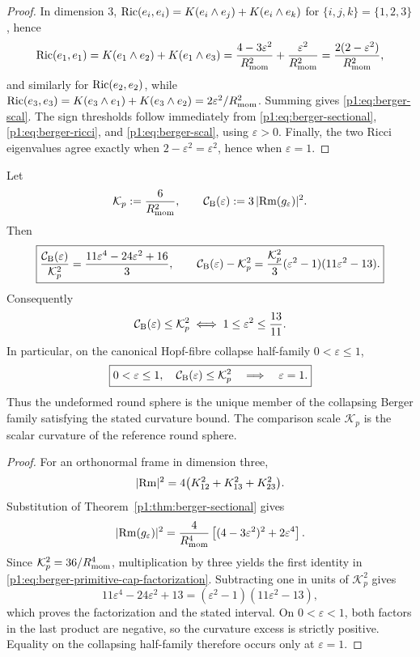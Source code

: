 \documentclass[11pt]{article}
\begin{document}
\begin{proof}
In dimension $3$, $\operatorname{Ric}(e_i,e_i)=K(e_i\wedge e_j)+K(e_i\wedge e_k)$ for $\{i,j,k\}=\{1,2,3\}$, hence
\[
\operatorname{Ric}(e_1,e_1)=K(e_1\wedge e_2)+K(e_1\wedge e_3)=\frac{4-3\varepsilon^2}{R_{\mathrm{mom}}^2}+\frac{\varepsilon^2}{R_{\mathrm{mom}}^2}
=\frac{2(2-\varepsilon^2)}{R_{\mathrm{mom}}^2},
\]
and similarly for $\operatorname{Ric}(e_2,e_2)$, while $\operatorname{Ric}(e_3,e_3)=K(e_3\wedge e_1)+K(e_3\wedge e_2)=2\varepsilon^2/R_{\mathrm{mom}}^2$.
Summing gives \eqref{p1:eq:berger-scal}.
The sign thresholds follow immediately from
\eqref{p1:eq:berger-sectional}, \eqref{p1:eq:berger-ricci}, and
\eqref{p1:eq:berger-scal}, using \(\varepsilon>0\).  Finally, the two Ricci
eigenvalues agree exactly when \(2-\varepsilon^2=\varepsilon^2\), hence when
\(\varepsilon=1\).
\end{proof}

\begin{corollary}
\label{p1:cor:berger-primitive-cap-rigidity}
Let
\[
 \mathcal K_p:=\frac{6}{R_{\mathrm{mom}}^2},
 \qquad
 \mathcal C_{\rm B}(\varepsilon)
 :=3\,\lvert\operatorname{Rm}(g_\varepsilon)\rvert^2 .
\]
Then
\begin{equation}
\label{p1:eq:berger-primitive-cap-factorization}
 \boxed{
 \frac{\mathcal C_{\rm B}(\varepsilon)}{\mathcal K_p^2}
 =\frac{11\varepsilon^4-24\varepsilon^2+16}{3},
 \qquad
 \mathcal C_{\rm B}(\varepsilon)-\mathcal K_p^2
 =\frac{\mathcal K_p^2}{3}
   (\varepsilon^2-1)(11\varepsilon^2-13).}
\end{equation}
Consequently
\[
 \mathcal C_{\rm B}(\varepsilon)\le \mathcal K_p^2
 \iff
 1\le\varepsilon^2\le\frac{13}{11}.
\]
In particular, on the canonical Hopf-fibre collapse half-family
\(0<\varepsilon\le1\),
\begin{equation}
\label{p1:eq:berger-collapse-cap-rigidity}
 \boxed{
 0<\varepsilon\le1,
 \quad \mathcal C_{\rm B}(\varepsilon)\le \mathcal K_p^2
 \quad\Longrightarrow\quad
 \varepsilon=1.}
\end{equation}
Thus the undeformed round sphere is the unique member of the collapsing
Berger family satisfying the stated curvature bound.  The comparison scale
\(\mathcal K_p\) is the scalar curvature of the reference round sphere.
\end{corollary}

\begin{proof}
For an orthonormal frame in dimension three,
\[
 \lvert\operatorname{Rm}\rvert^2
 =4\bigl(K_{12}^2+K_{13}^2+K_{23}^2\bigr).
\]
Substitution of Theorem~\ref{p1:thm:berger-sectional} gives
\[
 \lvert\operatorname{Rm}(g_\varepsilon)\rvert^2
 =\frac{4}{R_{\mathrm{mom}}^4}
 \left[(4-3\varepsilon^2)^2+2\varepsilon^4\right].
\]
Since \(\mathcal K_p^2=36/R_{\mathrm{mom}}^4\), multiplication by three yields the first identity
in \eqref{p1:eq:berger-primitive-cap-factorization}.  Subtracting one in
units of \(\mathcal K_p^2\) gives
\[
 11\varepsilon^4-24\varepsilon^2+13
 =(\varepsilon^2-1)(11\varepsilon^2-13),
\]
which proves the factorization and the stated interval.  On
\(0<\varepsilon<1\), both factors in the last product are negative, so the
curvature excess is strictly positive.  Equality on the collapsing
half-family therefore occurs only at \(\varepsilon=1\).
\end{proof}
\end{document}
